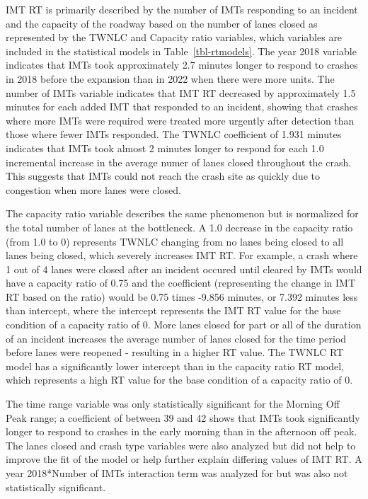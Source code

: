 \documentclass[
  letterpaper,
  authoryear]{elsarticle}
\begin{document}
IMT RT is primarily described by the number of IMTs responding to an
incident and the capacity of the roadway based on the number of lanes
closed as represented by the TWNLC and Capacity ratio variables, which
variables are included in the statistical models in
Table~\ref{tbl-rtmodels}. The year 2018 variable indicates that IMTs
took approximately 2.7 minutes longer to respond to crashes in 2018
before the expansion than in 2022 when there were more units. The number
of IMTs variable indicates that IMT RT decreased by approximately 1.5
minutes for each added IMT that responded to an incident, showing that
crashes where more IMTs were required were treated more urgently after
detection than those where fewer IMTs responded. The TWNLC coefficient
of 1.931 minutes indicates that IMTs took almost 2 minutes longer to
respond for each 1.0 incremental increase in the average numer of lanes
closed throughout the crash. This suggests that IMTs could not reach the
crash site as quickly due to congestion when more lanes were closed.

The capacity ratio variable describes the same phenomenon but is
normalized for the total number of lanes at the bottleneck. A 1.0
decrease in the capacity ratio (from 1.0 to 0) represents TWNLC changing
from no lanes being closed to all lanes being closed, which severely
increases IMT RT. For example, a crash where 1 out of 4 lanes were
closed after an incident occured until cleared by IMTs would have a
capacity ratio of 0.75 and the coefficient (representing the change in
IMT RT based on the ratio) would be 0.75 times -9.856 minutes, or 7.392
minutes less than intercept, where the intercept represents the IMT RT
value for the base condition of a capacity ratio of 0. More lanes closed
for part or all of the duration of an incident increases the average
number of lanes closed for the time period before lanes were reopened -
resulting in a higher RT value. The TWNLC RT model has a significantly
lower intercept than in the capacity ratio RT model, which represents a
high RT value for the base condition of a capacity ratio of 0.

The time range variable was only statistically significant for the
Morning Off Peak range; a coefficient of between 39 and 42 shows that
IMTs took significantly longer to respond to crashes in the early
morning than in the afternoon off peak. The lanes closed and crash type
variables were also analyzed but did not help to improve the fit of the
model or help further explain differing values of IMT RT. A year
2018*Number of IMTs interaction term was analyzed for but was also not
statistically significant.
\end{document}
